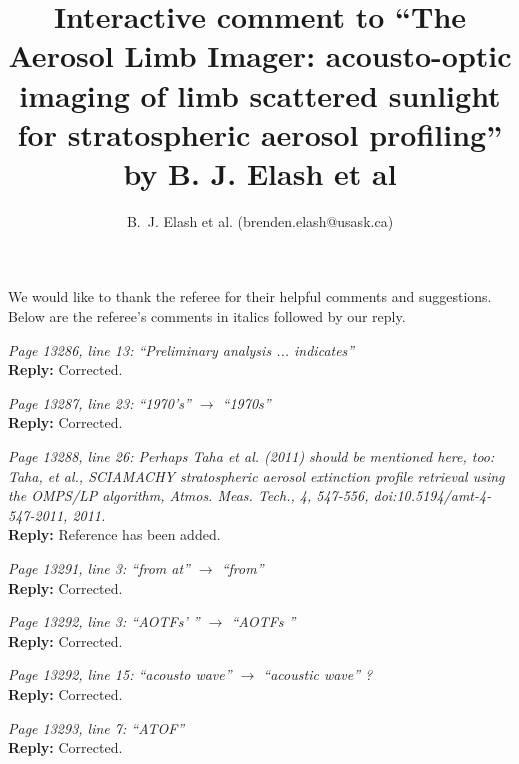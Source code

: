 \documentclass[12pt, notitlepage]{article}
\title{Interactive comment to ``The Aerosol Limb Imager: acousto-optic imaging of limb scattered
sunlight for stratospheric aerosol profiling'' by B. J. Elash et al}
\author{B.~J. Elash et al. (brenden.elash@usask.ca)}
\begin{document}
\begin{titlepage}
\maketitle
\end{titlepage}


We would like to thank the referee for their helpful comments and suggestions. Below are the referee's comments in italics followed by our reply.

\hrulefill

\textit{Page 13286, line 13: ``Preliminary analysis ... indicates''}\\

\textbf{Reply:} Corrected.

\hrulefill

\textit{Page 13287, line 23: ``1970's'' $\rightarrow$ ``1970s''}\\

\textbf{Reply:} Corrected.

\hrulefill

\textit{Page 13288, line 26: Perhaps Taha et al. (2011) should be mentioned here, too: Taha, et al., SCIAMACHY stratospheric aerosol extinction profile retrieval using the OMPS/LP algorithm, Atmos. Meas. Tech., 4, 547-556, doi:10.5194/amt-4-547-2011, 2011.}\\

\textbf{Reply:} Reference has been added.

\hrulefill

\textit{Page 13291, line 3: ``from at'' $\rightarrow$ ``from''}\\

\textbf{Reply:} Corrected.

\hrulefill

\textit{Page 13292, line 3: ``AOTFs' '' $\rightarrow$ ``AOTFs ''}\\

\textbf{Reply:} Corrected.

\hrulefill

\textit{Page 13292, line 15: ``acousto wave'' $\rightarrow$ ``acoustic wave'' ?}\\

\textbf{Reply:} Corrected.

\hrulefill

\textit{Page 13293, line 7: ``ATOF''}\\

\textbf{Reply:} Corrected.

\hrulefill
\end{document}
